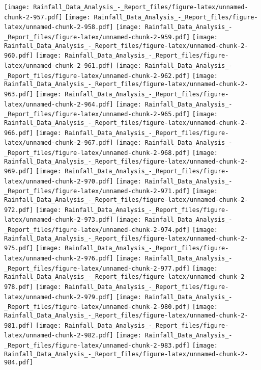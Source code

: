 \documentclass[
]{article}
\begin{document}
\texttt{[image: Rainfall\_Data\_Analysis\_-\_Report\_files/figure-latex/unnamed-chunk-2-957.pdf]}
\texttt{[image: Rainfall\_Data\_Analysis\_-\_Report\_files/figure-latex/unnamed-chunk-2-958.pdf]}
\texttt{[image: Rainfall\_Data\_Analysis\_-\_Report\_files/figure-latex/unnamed-chunk-2-959.pdf]}
\texttt{[image: Rainfall\_Data\_Analysis\_-\_Report\_files/figure-latex/unnamed-chunk-2-960.pdf]}
\texttt{[image: Rainfall\_Data\_Analysis\_-\_Report\_files/figure-latex/unnamed-chunk-2-961.pdf]}
\texttt{[image: Rainfall\_Data\_Analysis\_-\_Report\_files/figure-latex/unnamed-chunk-2-962.pdf]}
\texttt{[image: Rainfall\_Data\_Analysis\_-\_Report\_files/figure-latex/unnamed-chunk-2-963.pdf]}
\texttt{[image: Rainfall\_Data\_Analysis\_-\_Report\_files/figure-latex/unnamed-chunk-2-964.pdf]}
\texttt{[image: Rainfall\_Data\_Analysis\_-\_Report\_files/figure-latex/unnamed-chunk-2-965.pdf]}
\texttt{[image: Rainfall\_Data\_Analysis\_-\_Report\_files/figure-latex/unnamed-chunk-2-966.pdf]}
\texttt{[image: Rainfall\_Data\_Analysis\_-\_Report\_files/figure-latex/unnamed-chunk-2-967.pdf]}
\texttt{[image: Rainfall\_Data\_Analysis\_-\_Report\_files/figure-latex/unnamed-chunk-2-968.pdf]}
\texttt{[image: Rainfall\_Data\_Analysis\_-\_Report\_files/figure-latex/unnamed-chunk-2-969.pdf]}
\texttt{[image: Rainfall\_Data\_Analysis\_-\_Report\_files/figure-latex/unnamed-chunk-2-970.pdf]}
\texttt{[image: Rainfall\_Data\_Analysis\_-\_Report\_files/figure-latex/unnamed-chunk-2-971.pdf]}
\texttt{[image: Rainfall\_Data\_Analysis\_-\_Report\_files/figure-latex/unnamed-chunk-2-972.pdf]}
\texttt{[image: Rainfall\_Data\_Analysis\_-\_Report\_files/figure-latex/unnamed-chunk-2-973.pdf]}
\texttt{[image: Rainfall\_Data\_Analysis\_-\_Report\_files/figure-latex/unnamed-chunk-2-974.pdf]}
\texttt{[image: Rainfall\_Data\_Analysis\_-\_Report\_files/figure-latex/unnamed-chunk-2-975.pdf]}
\texttt{[image: Rainfall\_Data\_Analysis\_-\_Report\_files/figure-latex/unnamed-chunk-2-976.pdf]}
\texttt{[image: Rainfall\_Data\_Analysis\_-\_Report\_files/figure-latex/unnamed-chunk-2-977.pdf]}
\texttt{[image: Rainfall\_Data\_Analysis\_-\_Report\_files/figure-latex/unnamed-chunk-2-978.pdf]}
\texttt{[image: Rainfall\_Data\_Analysis\_-\_Report\_files/figure-latex/unnamed-chunk-2-979.pdf]}
\texttt{[image: Rainfall\_Data\_Analysis\_-\_Report\_files/figure-latex/unnamed-chunk-2-980.pdf]}
\texttt{[image: Rainfall\_Data\_Analysis\_-\_Report\_files/figure-latex/unnamed-chunk-2-981.pdf]}
\texttt{[image: Rainfall\_Data\_Analysis\_-\_Report\_files/figure-latex/unnamed-chunk-2-982.pdf]}
\texttt{[image: Rainfall\_Data\_Analysis\_-\_Report\_files/figure-latex/unnamed-chunk-2-983.pdf]}
\texttt{[image: Rainfall\_Data\_Analysis\_-\_Report\_files/figure-latex/unnamed-chunk-2-984.pdf]}
\end{document}

